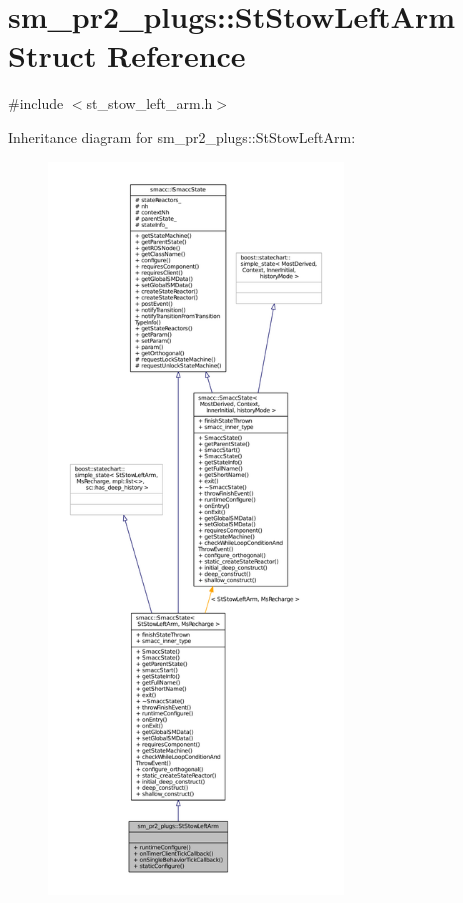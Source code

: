 \hypertarget{structsm__pr2__plugs_1_1StStowLeftArm}{}\section{sm\+\_\+pr2\+\_\+plugs\+:\+:St\+Stow\+Left\+Arm Struct Reference}
\label{structsm__pr2__plugs_1_1StStowLeftArm}


{\ttfamily \#include $<$st\+\_\+stow\+\_\+left\+\_\+arm.\+h$>$}



Inheritance diagram for sm\+\_\+pr2\+\_\+plugs\+:\+:St\+Stow\+Left\+Arm\+:
\nopagebreak
\begin{figure}[H]
\begin{center}
\leavevmode
\includegraphics[height=550pt]{structsm__pr2__plugs_1_1StStowLeftArm__inherit__graph}
\end{center}
\end{figure}


